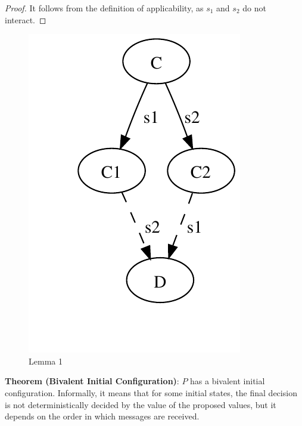 \documentclass[12pt]{article}
\newenvironment{lemma}[1]{\textbf{Theorem (#1)}: }{\medskip}
\begin{document}
\begin{proof}
It follows from the definition of applicability, as $s_1$ and $s_2$ do not
interact.
\end{proof}

\begin{figure}
\begin{center}
\includegraphics{consensus-fig1.pdf}
\end{center}
\caption{Lemma 1}
\end{figure}


\newpage
\begin{lemma}{Bivalent Initial Configuration}
$P$ has a bivalent initial configuration. 
%
Informally, it means that for some initial
states, the final decision is not deterministically decided by 
the value of the proposed values, but it depends on the order
in which messages are received.
\end{lemma}
\end{document}
